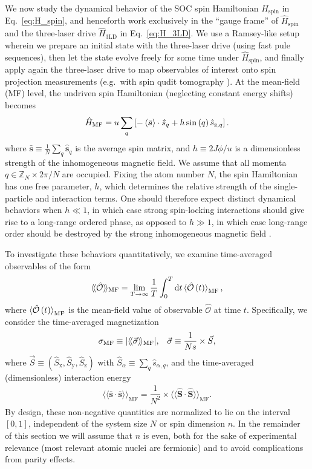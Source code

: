 \documentclass[aps,pra,nofootinbib,twocolumn,superscriptaddress]{revtex4-2}
\renewcommand{\t}{\text} %
\newcommand{\f}[2]{\dfrac{#1}{#2}} %
\newcommand{\p}[1]{\left(#1\right)} %
\renewcommand{\sp}[1]{\left[#1\right]} %
\newcommand{\bk}{\braket} %
\renewcommand{\v}{\bm} %
\renewcommand{\dd}{\text{d}} %
\newcommand{\bbk}[1]{\langle\!\langle #1 \rangle\!\rangle}
\newcommand{\1}{\mathds{1}}
\newcommand{\s}{\hat s}
\renewcommand{\H}{\hat H}
\renewcommand{\S}{\hat S}
\renewcommand{\O}{\hat{\mathcal{O}}}
\newcommand{\x}{\text{x}}
\newcommand{\y}{\text{y}}
\newcommand{\z}{\text{z}}
\newcommand{\ZZ}{\mathbb{Z}}
\newcommand{\spin}{\text{spin}}
\newcommand{\MF}{\text{MF}}
\renewcommand{\ss}{\bar{\v s}\cdot\bar{\v s}}
\begin{document}
We now study the dynamical behavior of the SOC spin Hamiltonian $H_\spin$ in Eq.~\eqref{eq:H_spin}, and henceforth work exclusively in the ``gauge frame'' of $\H_\spin$ and the three-laser drive $\H_{\t{3LD}}$ in Eq.~\eqref{eq:H_3LD}.
We use a Ramsey-like setup wherein we prepare an initial state with the three-laser drive (using fast pule sequences), then let the state evolve freely for some time under $\H_\spin$, and finally apply again the three-laser drive to map observables of interest onto spin projection measurements (e.g.~with spin qudit tomography \cite{newton1968measurability, perlin2020qudit}).
At the mean-field (MF) level, the undriven spin Hamiltonian (neglecting constant energy shifts) becomes
\begin{align}
  \H_\MF = u \sum_q\sp{-\bk{\bar{\v s}}\cdot\v\s_q
    + h \sin\p{q} \s_{\z,q}}.
  \label{eq:H_MF}
\end{align}
where $\bar{\v s}\equiv\frac1N\sum_q\v\s_q$ is the average spin matrix, and $h\equiv 2J\phi/u$ is a dimensionless strength of the inhomogeneous magnetic field.
We assume that all momenta $q\in\ZZ_N\times 2\pi/N$ are occupied.
Fixing the atom number $N$, the spin Hamiltonian has one free parameter, $h$, which determines the relative strength of the single-particle and interaction terms.
One should therefore expect distinct dynamical behaviors when $h\ll1$, in which case strong spin-locking interactions should give rise to a long-range ordered phase, as opposed to $h\gg1$, in which case long-range order should be destroyed by the strong inhomogeneous magnetic field \cite{smale2019observation}.

To investigate these behaviors quantitatively, we examine time-averaged observables of the form
\begin{align}
  \bbk{\O}_\MF = \lim_{T\to\infty} \f1T \int_0^T \dd t \bk{\O\p{t}}_\MF,
\end{align}
where $\bk{\O\p{t}}_\MF$ is the mean-field value of observable $\O$ at time $t$.
Specifically, we consider the time-averaged magnetization
\begin{align}
  \sigma_\MF \equiv \abs{\bbk{\vec\sigma}_\MF},
  &&
  \vec\sigma \equiv \f1{Ns} \times \vec S,
\end{align}
where $\vec S\equiv(\S_\x,\S_\y,\S_\z)$ with $\S_\alpha \equiv \sum_q \s_{\alpha,q}$, and the time-averaged (dimensionless) interaction energy
\begin{align}
  \bbk{\ss}_\MF = \f1{N^2} \times \bbk{\v\S\cdot\v\S}_\MF.
\end{align}
By design, these non-negative quantities are normalized to lie on the interval $[0,1]$, independent of the system size $N$ or spin dimension $n$.
In the remainder of this section we will assume that $n$ is even, both for the sake of experimental relevance (most relevant atomic nuclei are fermionic) and to avoid complications from parity effects.
\end{document}
